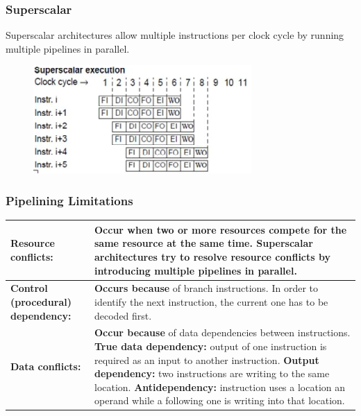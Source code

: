 		\begin{minipage}[t][7cm]{0.475\textwidth}
			\subsubsection{Superscalar}
			Superscalar architectures allow multiple instructions per clock cycle by running multiple pipelines in parallel.
			\vfill
			\begin{figure}[H]\centering
				\includegraphics[width=\textwidth]{./pictures/superscalar.png}
			\end{figure}
		\end{minipage}		
		
		
		\subsubsection{Pipelining Limitations}
			\begin{longtable}{|>{\bfseries}p{}|p{}|}				
				\hline
				Resource conflicts:
					& \textbf{Occur when} two or more resources compete for the same resource at the same time. Superscalar architectures try to resolve resource conflicts by introducing multiple pipelines in parallel.\\
				\hline
				Control (procedural) dependency:
					& \textbf{Occurs because} of branch instructions. In order to identify the next instruction, the current one has to be decoded first.\\
				\hline
				\label{tab:pipeliningLimitations} %
				Data conflicts:
					& \textbf{Occur because} of data dependencies between instructions.\newline
						\textbf{True data dependency:} output of one instruction is required as an input to another instruction.\newline
						\textbf{Output dependency:} two instructions are writing to the same location.\newline
						\textbf{Antidependency:} instruction uses a location an operand while a following one is writing into that location.\\
				\hline				
			\end{longtable}
			
